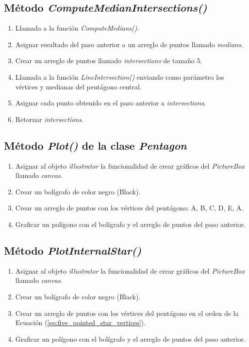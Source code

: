 \documentclass[oneside, a4paper]{article}
\begin{document}
        \subsection{Método \textit{ComputeMedianIntersections()}}

            \begin{enumerate}
                \item Llamada a la función \textit{ComputeMedians()}.
                \item Asignar resultado del paso anterior a un arreglo de puntos llamado \textit{medians}.
                \item Crear un arreglo de puntos llamado \textit{intersections} de tamaño 5.
                \item Llamada a la función \textit{LineIntersection()} enviando como parámetro los vértices y medianas del pentágono central.
                \item Asignar cada punto obtenido en el paso anterior a \textit{intersections}.
                \item Retornar \textit{intersections}.
            \end{enumerate}

        \subsection{Método \textit{Plot()} de la clase \textit{Pentagon}}

            \begin{enumerate}
                \item Asignar al objeto \textit{illustrator} la funcionalidad de crear gráficos del \textit{PictureBox} llamado \textit{canvas}.
                \item Crear un bolígrafo de color negro (Black).
                \item Crear un arreglo de puntos con los vértices del pentágono: A, B, C, D, E, A.
                \item Graficar un polígono con el bolígrafo y el arreglo de puntos del paso anterior.
            \end{enumerate}

        \subsection{Método \textit{PlotInternalStar()}}

            \begin{enumerate}
                \item Asignar al objeto \textit{illustrator} la funcionalidad de crear gráficos del \textit{PictureBox} llamado \textit{canvas}.
                \item Crear un bolígrafo de color negro (Black).
                \item Crear un arreglo de puntos con los vértices del pentágono en el orden de la Ecuación (\ref{eq:five_pointed_star_vertices}).
                \item Graficar un polígono con el bolígrafo y el arreglo de puntos del paso anterior.
            \end{enumerate}
\end{document}
